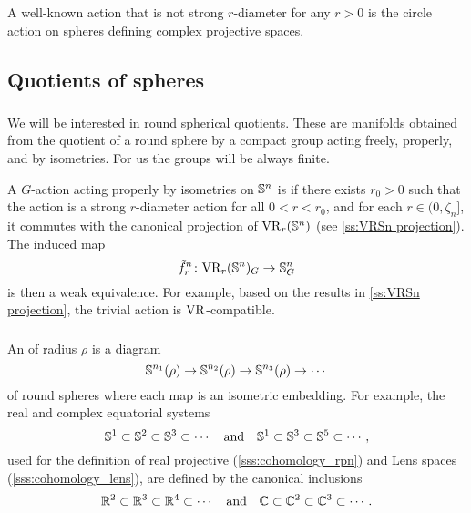 A well-known action that is not strong \(r\)-diameter for any \(r>0\) is the circle action on spheres defining complex projective spaces.

\subsection{Quotients of spheres}

\subsubsection{}\label{ss:VR-compatible-Sn}

We will be interested in round spherical quotients.
These are manifolds obtained from the quotient of a round sphere by a compact group acting freely, properly, and by isometries.
For us the groups will be always finite.

A \(G\)-action acting properly by isometries on \(\mathbb{S}^n\) is  if there exists \(r_0 > 0\) such that the action is a strong \(r\)-diameter action for all \(0 < r < r_0\), and for each \(r \in (0, \zeta_n]\), it commutes with the canonical projection of \(\mathrm{VR}_r(\mathbb{S}^n)\) (see \cref{ss:VRSn projection}). The induced map
\[
\tilde f_r^n \colon \mathrm{VR}_r(\mathbb{S}^n)_G \to \mathbb{S}^n_G
\]
is then a weak equivalence. 
For example, based on the results in \cref{ss:VRSn projection}, the trivial action is \(\mathrm{VR}\)-compatible.


\subsubsection{}\label{subsub:VR-compatible-system}

An  of radius \(\rho\) is a diagram
\[
\mathbb{S}^{n_1}(\rho) \to \mathbb{S}^{n_2}(\rho) \to \mathbb{S}^{n_3}(\rho) \to \dotsb
\]
of round spheres where each map is an isometric embedding.
For example, the real and complex equatorial systems
\[
\mathbb{S}^1 \subset \mathbb{S}^2 \subset \mathbb{S}^3 \subset \dotsb
\quad\text{and}\quad
\mathbb{S}^1 \subset \mathbb{S}^3 \subset \mathbb{S}^5 \subset \dotsb,
\]
used for the definition of real projective (\cref{sss:cohomology_rpn}) and Lens spaces (\cref{sss:cohomology_lens}), are defined by the canonical inclusions
\[
\mathbb{R}^2 \subset \mathbb{R}^3 \subset \mathbb{R}^4 \subset \dotsb
\quad\text{and}\quad
\mathbb{C} \subset \mathbb{C}^2 \subset \mathbb{C}^3 \subset \dotsb.
\]

